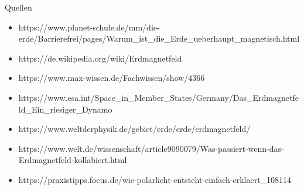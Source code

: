\documentclass[10pt]{beamer}
\begin{document}
\begin{frame}{Quellen}
    \begin{itemize}
        \item https://www.planet-schule.de/mm/die-erde/Barrierefrei/pages/Warum\_ist\_die\_Erde\_ueberhaupt\_magnetisch.html
        \item https://de.wikipedia.org/wiki/Erdmagnetfeld
        \item https://www.max-wissen.de/Fachwissen/show/4366
        \item https://www.esa.int/Space\_in\_Member\_States/Germany/Das\_Erdmagnetfeld\_Ein\_riesiger\_Dynamo
        \item https://www.weltderphysik.de/gebiet/erde/erde/erdmagnetfeld/
        \item https://www.welt.de/wissenschaft/article9090079/Was-passiert-wenn-das-Erdmagnetfeld-kollabiert.html
        \item https://praxistipps.focus.de/wie-polarlicht-entsteht-einfach-erklaert\_108114
    \end{itemize}
\end{frame}
\end{document}
